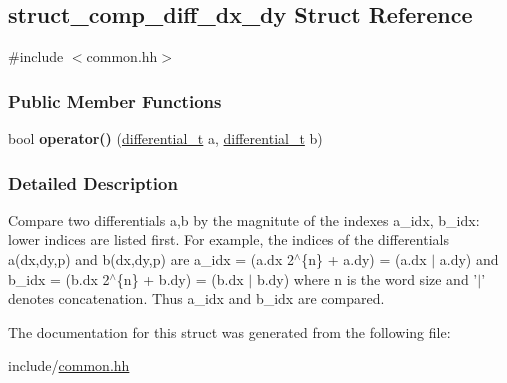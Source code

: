 \hypertarget{structstruct__comp__diff__dx__dy}{\subsection{struct\-\_\-comp\-\_\-diff\-\_\-dx\-\_\-dy \-Struct \-Reference}
\label{structstruct__comp__diff__dx__dy}
}


{\ttfamily \#include $<$common.\-hh$>$}

\subsubsection*{\-Public \-Member \-Functions}
\begin{DoxyCompactItemize}
\item 
\hypertarget{structstruct__comp__diff__dx__dy_aac9a66c266b079d08f3966a8404e746d}{bool {\bfseries operator()} (\hyperlink{structdifferential__t}{differential\-\_\-t} a, \hyperlink{structdifferential__t}{differential\-\_\-t} b)}\label{structstruct__comp__diff__dx__dy_aac9a66c266b079d08f3966a8404e746d}

\end{DoxyCompactItemize}


\subsubsection{\-Detailed \-Description}
\-Compare two differentials a,b by the magnitute of the indexes a\-\_\-idx, b\-\_\-idx\-: lower indices are listed first. \-For example, the indices of the differentials a(dx,dy,p) and b(dx,dy,p) are a\-\_\-idx = (a.\-dx 2$^\wedge$\{n\} + a.\-dy) = (a.\-dx $|$ a.\-dy) and b\-\_\-idx = (b.\-dx 2$^\wedge$\{n\} + b.\-dy) = (b.\-dx $|$ b.\-dy) where n is the word size and '$|$' denotes concatenation. \-Thus a\-\_\-idx and b\-\_\-idx are compared. 

\-The documentation for this struct was generated from the following file\-:\begin{DoxyCompactItemize}
\item 
include/\hyperlink{common_8hh}{common.\-hh}\end{DoxyCompactItemize}
